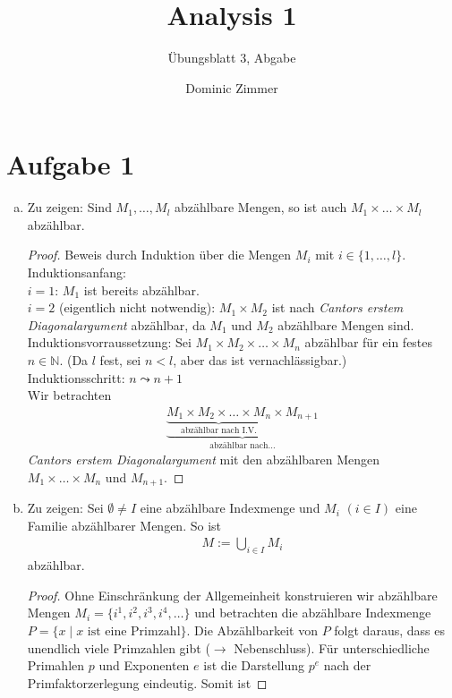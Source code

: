 \documentclass{scrreprt}
\newcommand{\NN}{\mathbb{N}}
\begin{document}
	\title{Analysis 1}
 	\author{Dominic Zimmer}
 	\subtitle{Übungsblatt 3, Abgabe}
 	\publishers{Übungsgruppe: Rami Ahmad}
  	\maketitle 


	\section*{Aufgabe 1}
	\begin{enumerate}[(a)]
		\item
			Zu zeigen: Sind $M_1, \dots, M_l$ abzählbare Mengen, so ist auch $M_1 \times \dots \times M_l$ abzählbar.
			\begin{proof}
				Beweis durch Induktion über die Mengen $M_i$ mit $i \in \lbrace 1, \dots, l\rbrace$.\\
				Induktionsanfang:\\
				$ i = 1$:
				$M_1$ ist bereits abzählbar.\\
				$i = 2$ (eigentlich nicht notwendig): $M_1 \times M_2$ ist nach \emph{Cantors erstem Diagonalargument} abzählbar, da $M_1$ und $M_2$ abzählbare Mengen sind.\\
				Induktionsvorraussetzung: Sei $M_1 \times M_2 \times \dots \times M_n$ abzählbar für ein festes $n \in \NN$. (Da $l$ fest, sei $n < l$, aber das ist vernachlässigbar.)\\
				Induktionsschritt: $n \leadsto n+1$\\
				Wir betrachten
				\begin{align*}
					\underbrace{\underbrace{M_1 \times M_2 \times \dots \times M_n}_\text{abzählbar nach I.V.}\times M_{n+1}}_\text{abzählbar nach...}
				\end{align*}
				\emph{Cantors erstem Diagonalargument} mit den abzählbaren Mengen $M_1 \times \dots \times M_n$ und $M_{n+1}$.
			\end{proof}
		\item
			Zu zeigen: Sei $\emptyset \neq I$ eine abzählbare Indexmenge und $M_i$ $(i \in I)$ eine Familie abzählbarer Mengen. So ist
			\begin{align*}
				M := \bigcup\limits_{i \in I} M_i
			\end{align*}
			abzählbar.
			\begin{proof}
				Ohne Einschränkung der Allgemeinheit konstruieren wir abzählbare Mengen $M_i = \lbrace i^1, i^2, i^3, i^4, \dots \rbrace$ und betrachten die abzählbare Indexmenge $P = \lbrace x \mid \text{$x$ ist eine Primzahl}\rbrace$. Die Abzählbarkeit von $P$ folgt daraus, dass es unendlich viele Primzahlen gibt ($\rightarrow$ Nebenschluss). Für unterschiedliche Primahlen $p$ und Exponenten $e$ ist die Darstellung $p^e$ nach der Primfaktorzerlegung eindeutig. Somit ist

\end{proof}
\end{enumerate}
\end{document}

